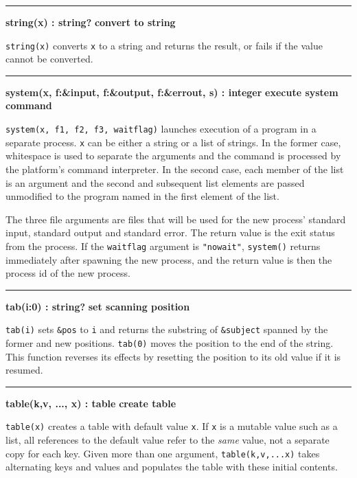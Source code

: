 \bigskip\hrule\vspace{0.1cm}
\noindent
{\bf string(x) : string? } \hfill {\bf convert to string}

\noindent
{}\texttt{string(x)} converts
\texttt{x} to a string and returns the result, or fails if the value
cannot be converted.

\bigskip\hrule\vspace{0.1cm}
\noindent
{\bf system(x, f:\&input, f:\&output, f:\&errout, s) : integer } \hfill {\bf execute system command}

\noindent
{}\texttt{system(x, f1, f2, f3, waitflag)} launches
execution of a program in a separate process. \texttt{x} can be either
a string or a list of strings. In the former case, whitespace is used
to separate the arguments and the command is processed by the
platform's command interpreter. In the second case,
each member of the list is an argument and the second and subsequent
list elements are passed unmodified to the program named in the first
element of the list.

The three file arguments are files that will be used for the new
process' standard input, standard output and standard
error. The return value is the exit status from the process. If the
\texttt{waitflag} argument is
\texttt{"nowait"}, \texttt{system()}
returns immediately after spawning the new process, and the return
value is then the process id of the new process.

\bigskip\hrule\vspace{0.1cm}
\noindent
{\bf tab(i:0) : string? } \hfill {\bf set scanning position}

\noindent
{}\texttt{tab(i)} sets \texttt{\&pos} to \texttt{i} and
returns the substring of \texttt{\&subject} spanned by the former and
new positions. \texttt{tab(0)} moves the position to the end of the
string. This function reverses its effects by resetting the position to
its old value if it is resumed.

\bigskip\hrule\vspace{0.1cm}
\noindent
{\bf table(k,v, ..., x) : table } \hfill {\bf create table}

\noindent
{}\texttt{table(x)} creates a table with default value
\texttt{x}. If \texttt{x} is a mutable value such as a list, all
references to the default value refer to the \textit{same} value, not a
separate copy for each key. Given more than one argument,
\texttt{table(k,v,...x)} takes alternating keys and values and
populates the table with these initial contents.

